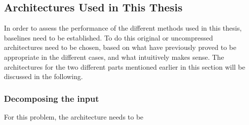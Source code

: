 \subsection{Architectures Used in This Thesis}
In order to assess the performance of the different methods used in this thesis, baselines need to be established. To do this original or uncompressed architectures need to be chosen, based on what have previously proved to be appropriate in the different cases, and what intuitively makes sense. The architectures for the two different parts mentioned earlier in this section will be discussed in the following.

\subsubsection{Decomposing the input}
For this problem, the architecture needs to be 